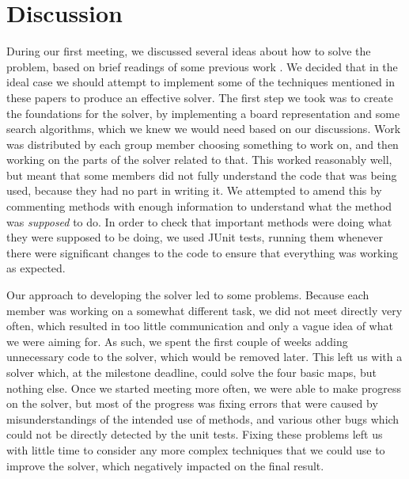 \documentclass[a4paper,11pt]{article}
\begin{document}
\section{Discussion}
During our first meeting, we discussed several ideas about how to solve the
problem, based on brief readings of some previous work \cite{virkkala, jung}. We
decided that in the ideal case we should attempt to implement some of the
techniques mentioned in these papers to produce an effective solver. The first
step we took was to create the foundations for the solver, by implementing a
board representation and some search algorithms, which we knew we would need
based on our discussions. Work was distributed by each group member choosing
something to work on, and then working on the parts of the solver related to
that. This worked reasonably well, but meant that some members did not fully
understand the code that was being used, because they had no part in writing
it. We attempted to amend this by commenting methods with enough information to
understand what the method was \emph{supposed} to do. In order to check that
important methods were doing what they were supposed to be doing, we used JUnit
tests, running them whenever there were significant changes to the code to
ensure that everything was working as expected.

Our approach to developing the solver led to some problems. Because each member
was working on a somewhat different task, we did not meet directly very often,
which resulted in too little communication and only a vague idea of what we were
aiming for. As such, we spent the first couple of weeks adding unnecessary code
to the solver, which would be removed later. This left us with a solver which,
at the milestone deadline, could solve the four basic maps, but nothing
else. Once we started meeting more often, we were able to make progress on the
solver, but most of the progress was fixing errors that were caused by
misunderstandings of the intended use of methods, and various other bugs which
could not be directly detected by the unit tests. Fixing these problems left us
with little time to consider any more complex techniques that we could use to
improve the solver, which negatively impacted on the final result.
\end{document}
